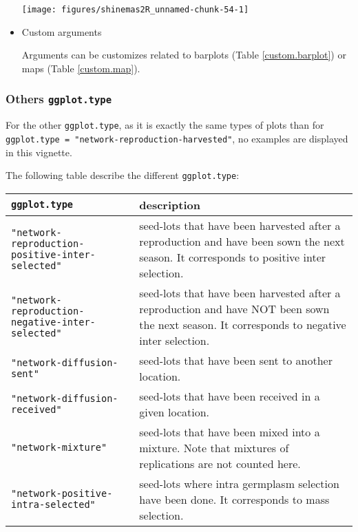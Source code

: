 \documentclass{article}\usepackage[]{graphicx}\usepackage[]{color}
\newenvironment{knitrout}{}{} %
\begin{document}
\begin{itemize}
\begin{knitrout}
{\centering \texttt{[image: figures/shinemas2R\_unnamed-chunk-54-1]} 

}



\end{knitrout}

\item Custom arguments

Arguments can be customizes related to barplots (Table \ref{custom.barplot}) or maps (Table \ref{custom.map}).

\end{itemize}

\subsubsection{Others \texttt{ggplot.type}}

For the other \texttt{ggplot.type}, as it is exactly the same types of plots than for
\texttt{ggplot.type = "network-reproduction-harvested"}, no examples are displayed in this vignette.

The following table describe the different \texttt{ggplot.type}:

\begin{center}
\begin{tabular}{ p{} p{} }
\hline
\texttt{ggplot.type} & description \\
\hline

\texttt{"network-reproduction-positive-inter-selected"} & seed-lots that have been harvested after a reproduction and have been sown the next season.
It corresponds to positive inter selection. \\

\texttt{"network-reproduction-negative-inter-selected"} & seed-lots that have been harvested after a reproduction and have NOT been sown the next season.
It corresponds to negative inter selection. \\

\texttt{"network-diffusion-sent"} & seed-lots that have been sent to another location. \\

\texttt{"network-diffusion-received"} & seed-lots that have been received in a given location. \\

\texttt{"network-mixture"} & seed-lots that have been mixed into a mixture. Note that mixtures of replications are not counted here. \\

\texttt{"network-positive-intra-selected"} & seed-lots where intra germplasm selection have been done.
It corresponds to mass selection. \\

\hline
\end{tabular}
\end{center}
\end{document}
